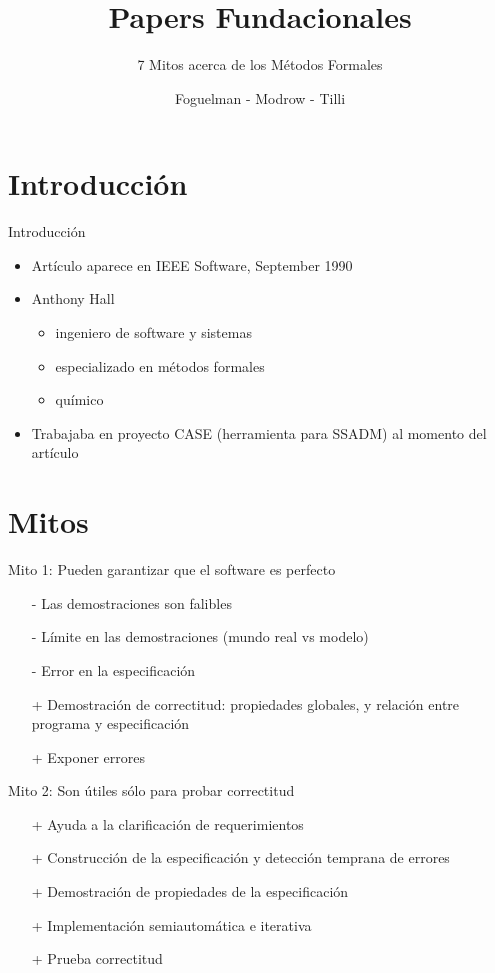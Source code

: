\documentclass{beamer}
\title{Papers Fundacionales}
\subtitle{7 Mitos acerca de los M\'etodos Formales}
\author{Foguelman - Modrow - Tilli}
\institute{DC - UBA}
\begin{document}
\frame{\titlepage}
\section{Introducci\'on}
\begin{frame}{Introducci\'on}
\begin{itemize}
\item Art\'iculo aparece en IEEE Software, September 1990
\item Anthony Hall 
\begin{itemize}
\item ingeniero de software y sistemas
\item especializado en m\'etodos formales
\item qu\'imico
\end{itemize}
\item Trabajaba en proyecto CASE (herramienta para SSADM) al momento del art\'iculo
\end{itemize}

\end{frame}

\section{Mitos}
\begin{frame}{Mito 1: Pueden garantizar que el software es perfecto }
\begin{itemize}[<+->]
\item[-] Las demostraciones son falibles 
\item[-] L\'imite en las demostraciones (mundo real vs modelo)
\item[-] Error en la especificaci\'on
\item[+] Demostraci\'on de correctitud: propiedades globales, y relaci\'on entre programa y especificaci\'on
\item[+] Exponer errores
\end{itemize}
\end{frame}

\begin{frame}{Mito 2: Son \'utiles s\'olo para probar correctitud}
\begin{itemize}[<+->]
\item[+] Ayuda a la clarificaci\'on de requerimientos
\item[+] Construcci\'on de la especificaci\'on y detecci\'on temprana de errores
\item[+] Demostraci\'on de propiedades de la especificaci\'on
\item[+] Implementaci\'on semiautom\'atica e iterativa
\item[+] Prueba correctitud
\end{itemize}
\end{frame}
 
\end{document}

